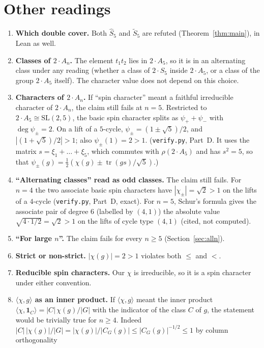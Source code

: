\documentclass[11pt]{article}
\theoremstyle{remark}
\newcommand{\tr}{\operatorname{tr}}
\newcommand{\Sh}{\widehat{S}}
\newcommand{\St}{\widetilde{S}}
\begin{document}
\section{Other readings}\label{sec:readings}
\begin{enumerate}
\item \textbf{Which double cover.} Both $\Sh_5$ and $\St_5$ are refuted (Theorem~\ref{thm:main}),
  in Lean as well.
\item \textbf{Classes of $2\cdot A_n$.} The element $t_1t_2$ lies in $2\cdot A_5$, so it is in an
  alternating class under any reading (whether a class of $2\cdot S_5$ inside $2\cdot A_5$, or a
  class of the group $2\cdot A_5$ itself). The character value does not depend on this choice.
\item \textbf{Characters of $2\cdot A_n$.} If ``spin character'' meant a faithful irreducible
  character of $2\cdot A_n$, the claim still fails at $n=5$. Restricted to
  $2\cdot A_5\cong\mathrm{SL}(2,5)$, the basic spin character splits as $\psi_++\psi_-$ with
  $\deg\psi_\pm=2$. On a lift of a $5$-cycle, $\psi_\pm=(1\pm\sqrt5)/2$, and
  $|(1+\sqrt5)/2|>1$; also $\psi_\pm(1)=2>1$. (\texttt{verify.py}, Part~D. It uses the matrix $s=\xi_1+\dots+\xi_5$, which commutes with
  $\rho(2\cdot A_5)$ and has $s^2=5$, so that $\psi_\pm(g)=\tfrac12(\chi(g)\pm\tr(gs)/\sqrt5)$.)
\item \textbf{``Alternating classes'' read as odd classes.} The claim still fails. For $n=4$ the two
  associate basic spin characters have $|\chi_\pm|=\sqrt2>1$ on the lifts of a $4$-cycle
  (\texttt{verify.py}, Part~D, exact). For $n=5$, Schur's formula gives the associate pair of
  degree $6$ (labelled by $(4,1)$) the absolute value $\sqrt{4\cdot1/2}=\sqrt2>1$ on the lifts of
  cycle type $(4,1)$ (cited, not computed).
\item \textbf{``For large $n$''.} The claim fails for every $n\ge5$ (Section~\ref{sec:alln}).
\item \textbf{Strict or non-strict.} $|\chi(g)|=2>1$ violates both $\le$ and $<$.
\item \textbf{Reducible spin characters.} Our $\chi$ is irreducible, so it is a spin character
  under either convention.
\item \textbf{$\langle\chi,g\rangle$ as an inner product.} If $\langle\chi,g\rangle$ meant the inner
  product $\langle\chi,\mathbf 1_C\rangle=|C|\,\chi(g)/|G|$ with the indicator of the class $C$ of
  $g$, the statement would be trivially true for $n\ge4$. Indeed
  $|C|\,|\chi(g)|/|G|=|\chi(g)|/|C_G(g)|\le|C_G(g)|^{-1/2}\le1$ by column orthogonality

\end{enumerate}
\end{document}
